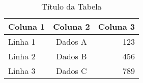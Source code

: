 
\begin{table}[htbp]
    \centering
    \caption{Título da Tabela}
    \label{tab:exemplo}
    \begin{tabular}{|l|c|r|}
        \hline
        \textbf{Coluna 1} & \textbf{Coluna 2} & \textbf{Coluna 3} \\
        \hline
        Linha 1 & Dados A & 123 \\
        Linha 2 & Dados B & 456 \\
        Linha 3 & Dados C & 789 \\
        \hline
    \end{tabular}
\end{table}



